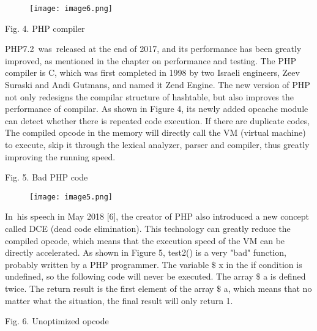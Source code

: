 \documentclass[12pt]{report}
\renewcommand{\_}{\kern-1.5pt\textunderscore\kern-1.5pt}
\begin{document}
\begin{multicols}{2}
\begin{figure}[H]
	\begin{Center}
		\texttt{[image: image6.png]}
	\end{Center}
\end{figure}

\setlength{\parskip}{6.0pt}
\begin{Center}
{\fontsize{8pt}{9.6pt}\selectfont Fig. 4. PHP compiler}
\end{Center}
\begin{justify}
{\fontsize{10pt}{12.0pt}\selectfont PHP7.2\ was\ released at the end of 2017, and its performance has been greatly improved, as mentioned in the chapter on performance and testing. The PHP compiler is C, which was first completed in 1998 by two Israeli engineers, Zeev Suraski and Andi Gutmans, and named it Zend Engine. The new version of PHP not only redesigns the compilar structure of hashtable, but also improves the performance of compilar.  As shown in Figure 4, its newly added opcache module can detect whether there is repeated code execution.  If there are duplicate codes, The compiled opcode in the memory will directly call the VM (virtual machine) to execute, skip it through the lexical analyzer, parser and compiler, thus greatly improving the running speed. \par}
\end{justify}
\begin{Center}
{\fontsize{8pt}{9.6pt}\selectfont Fig. 5. Bad PHP code}
\end{Center}

\begin{figure}[H]
	\begin{Center}
		\texttt{[image: image5.png]}
	\end{Center}
\end{figure}

\vspace{\baselineskip}\begin{justify}
{\fontsize{10pt}{12.0pt}\selectfont In\ his speech in May 2018 [6], the creator of PHP also introduced a new concept called DCE (dead code elimination).  This technology can greatly reduce the compiled opcode, which means that the execution speed of the VM can be directly accelerated. As shown in Figure 5, test2() is a very "bad" function, probably written by a PHP programmer. The variable $\$$ x in the if condition is undefined, so the following code will never be executed. The array $\$$ a is defined twice. The return result is the first element of the array $\$$ a, which means that no matter what the situation, the final result will only return 1.\par}
\end{justify}
\begin{Center}
{\fontsize{8pt}{9.6pt}\selectfont Fig. 6. Unoptimized opcode}
\end{Center}


\end{multicols}
\end{document}
